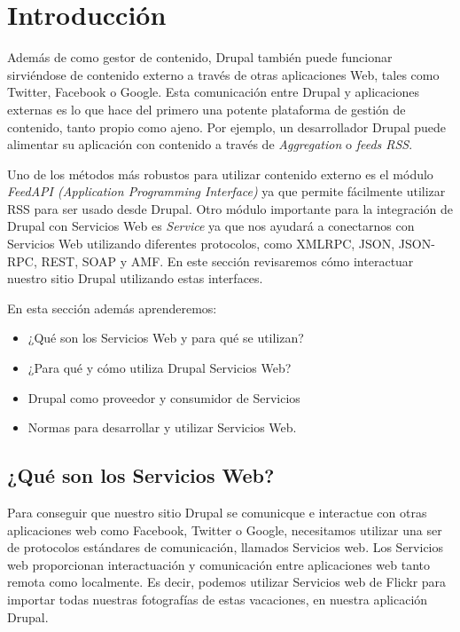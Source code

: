 \chapter{\huge{Introducción}}

Además de como gestor de contenido, Drupal también puede funcionar sirviéndose de contenido externo 
a través de otras aplicaciones Web, tales como Twitter, Facebook o Google. Esta comunicación entre 
Drupal y aplicaciones externas es lo que hace del primero una potente plataforma de gestión 
de contenido, tanto propio como ajeno. Por ejemplo, un desarrollador Drupal puede alimentar su aplicación
con contenido a través de \emph{Aggregation} o \emph{feeds RSS}. 

Uno de los métodos más robustos para utilizar contenido externo es el módulo 
\emph{FeedAPI (Application Programming Interface)} ya que permite fácilmente utilizar RSS 
para ser usado desde Drupal. Otro módulo importante para la integración de Drupal con Servicios Web es 
\emph{Service} ya que nos ayudará a conectarnos con Servicios Web utilizando diferentes protocolos, como
XMLRPC, JSON, JSON-RPC, REST, SOAP y AMF. En este sección revisaremos cómo interactuar nuestro sitio Drupal
utilizando estas interfaces.

En esta sección además aprenderemos:

\begin{itemize}
  \item ¿Qué son los Servicios Web y para qué se utilizan?
  \item ¿Para qué y cómo utiliza Drupal Servicios Web?
  \item Drupal como proveedor y consumidor de Servicios
  \item Normas para desarrollar y utilizar Servicios Web.
\end{itemize}

\section{¿Qué son los Servicios Web?}

Para conseguir que nuestro sitio Drupal se comunicque e interactue con otras aplicaciones web como
Facebook, Twitter o Google, necesitamos utilizar una ser de protocolos estándares de comunicación, 
llamados Servicios web. Los Servicios web proporcionan interactuación y comunicación entre aplicaciones 
web tanto remota como localmente. Es decir, podemos utilizar Servicios web de Flickr para importar todas 
nuestras fotografías de estas vacaciones, en nuestra aplicación Drupal.

